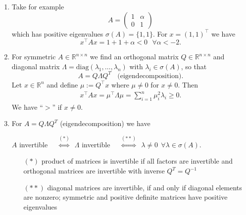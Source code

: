 {
\color{solution}
\begin{enumerate}
	\item Take for example 
	$$A=\begin{pmatrix}
	1&\alpha\\
	0&1
	\end{pmatrix} $$
	which has positive eigenvalues $\sigma(A)=\{1,1\}$. For $x=(1,1)^\top$ we have
		$$x^\top A x = 1+ 1+ \alpha  < 0~~~\forall \alpha < -2. $$
	\item 	For symmetric $A\in\mathbb{R}^{n\times n}$ we find an orthogonal matrix $Q\in\mathbb{R}^{n\times n}$ and diagonal matrix $\Lambda = \text{diag}(\lambda_1,\ldots,\lambda_n)$ with $\lambda_i\in\sigma(A)$, so that   $$A=Q\Lambda Q^T ~~~~\text{(eigendecomposition)}.$$
	Let $x \in \mathbb{R}^n$ and define $\mu := Q^\top x$ where $\mu \neq 0$ for $x\neq 0$. Then
	\begin{equation*}
	\begin{aligned}
	x^\top A x =   \mu^\top \Lambda \mu = \sum_{i=1}^n \mu_i^2 \lambda_i \geq 0.
	\end{aligned}
	\end{equation*}
	We have ``$>$'' if $x \neq 0$.
	\item 
	For $A=Q\Lambda Q^T$ (eigendecomposition) we have 
		\begin{center}
		$A$ invertible 
		~~$\stackrel{(*)}{\Leftrightarrow}\ \ \Lambda$ invertible 
		~~$\stackrel{(**)}{\Leftrightarrow}\ \ \lambda\neq 0\ \ \forall\lambda\in\sigma(A)$.
	\end{center}
	\begin{itemize}
		\item[$(*)$]  product of matrices is invertible if all factors are invertible and orthogonal matrices are invertible with inverse $Q^T=Q^{-1}$
		\item[$(**)$] diagonal matrices are invertible, if and only if diagonal elements are nonzero; symmetric and positive definite matrices have positive eigenvalues
	\end{itemize}
\end{enumerate}
}